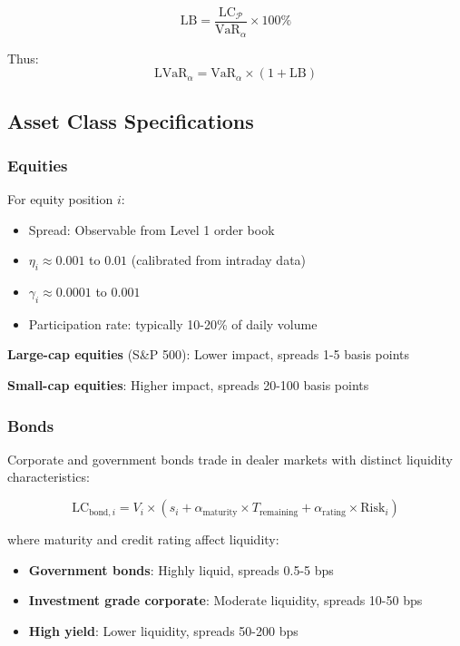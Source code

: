 \documentclass[11pt,a4paper]{article}
\begin{document}
\begin{equation}
\text{LB} = \frac{\text{LC}_\mathcal{P}}{\text{VaR}_\alpha} \times 100\%
\end{equation}

Thus:
\begin{equation}
\text{LVaR}_\alpha = \text{VaR}_\alpha \times (1 + \text{LB})
\end{equation}

\subsection{Asset Class Specifications}

\subsubsection{Equities}

For equity position $i$:

\begin{itemize}
    \item Spread: Observable from Level 1 order book
    \item $\eta_i \approx 0.001$ to $0.01$ (calibrated from intraday data)
    \item $\gamma_i \approx 0.0001$ to $0.001$
    \item Participation rate: typically 10-20\% of daily volume
\end{itemize}

\textbf{Large-cap equities} (S\&P 500): Lower impact, spreads 1-5 basis points

\textbf{Small-cap equities}: Higher impact, spreads 20-100 basis points

\subsubsection{Bonds}

Corporate and government bonds trade in dealer markets with distinct liquidity characteristics:

\begin{equation}
\text{LC}_{\text{bond},i} = V_i \times \left(s_i + \alpha_{\text{maturity}} \times T_{\text{remaining}} + \alpha_{\text{rating}} \times \text{Risk}_i\right)
\end{equation}

where maturity and credit rating affect liquidity:

\begin{itemize}
    \item \textbf{Government bonds}: Highly liquid, spreads 0.5-5 bps
    \item \textbf{Investment grade corporate}: Moderate liquidity, spreads 10-50 bps
    \item \textbf{High yield}: Lower liquidity, spreads 50-200 bps
\end{itemize}
\end{document}
